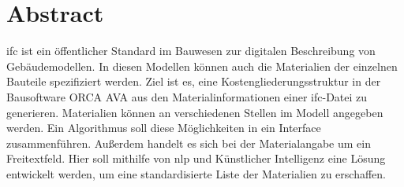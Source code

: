 \chapter*{Abstract}
\ac{ifc} ist ein öffentlicher Standard im Bauwesen zur digitalen Beschreibung von Gebäudemodellen. In diesen Modellen können auch die Materialien der einzelnen Bauteile spezifiziert werden. Ziel ist es, eine Kostengliederungsstruktur in der Bausoftware ORCA AVA aus den Materialinformationen einer \ac{ifc}-Datei zu generieren. Materialien können an verschiedenen Stellen im Modell angegeben werden. Ein Algorithmus soll diese Möglichkeiten in ein Interface zusammenführen. Außerdem handelt es sich bei der Materialangabe um ein Freitextfeld. Hier soll mithilfe von \ac{nlp} und Künstlicher Intelligenz eine Lösung entwickelt werden, um eine standardisierte Liste der Materialien zu erschaffen. 